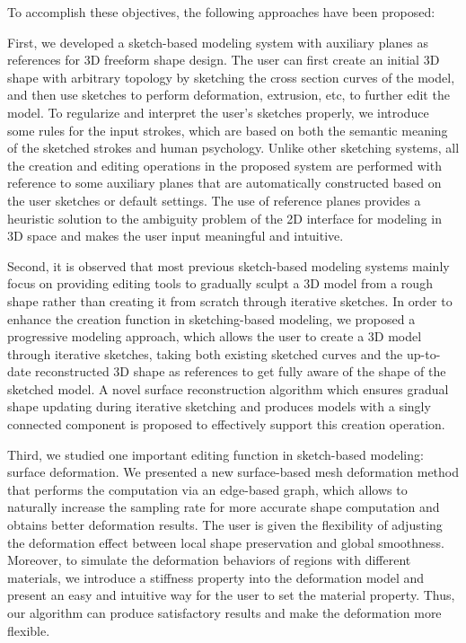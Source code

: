 To accomplish these objectives, the following approaches have been
proposed:

First, we developed a sketch-based modeling system with auxiliary
planes as  references for 3D freeform shape design. The user can
first create an initial 3D shape with arbitrary topology by
sketching the cross section curves of the model, and then use
sketches to perform deformation, extrusion, etc, to further edit the
model. To regularize and interpret the user's sketches properly, we
introduce some rules for the input strokes, which are based on both
the semantic meaning of the sketched strokes and human psychology.
Unlike other sketching systems, all the creation and editing
operations in the proposed system are performed with reference to
some auxiliary planes that are automatically constructed based on
the user sketches or default settings. The use of reference planes
provides a heuristic solution to the ambiguity problem of the 2D
interface for modeling in 3D space and makes the user input
meaningful and intuitive.

Second, it is observed that most previous sketch-based modeling
systems mainly focus on providing editing tools to gradually sculpt
a 3D model from a rough shape rather than creating it from scratch
through iterative sketches. In order to enhance the creation
function in sketching-based modeling, we proposed a progressive
modeling approach, which allows the user to create a 3D model
through iterative sketches, taking both existing sketched curves and
the up-to-date reconstructed 3D shape as references to get fully
aware of the shape of the sketched model. A novel surface
reconstruction algorithm which ensures gradual shape updating during
iterative sketching and produces models with a singly connected
component is proposed to effectively support this creation
operation.

Third, we studied one important editing function in sketch-based
modeling: surface deformation. We presented a new surface-based mesh
deformation method that performs the computation via an edge-based
graph, which allows to naturally increase the sampling rate for more
accurate shape computation and obtains better deformation results.
The user is given the flexibility of adjusting the deformation
effect between local shape preservation and global smoothness.
Moreover, to simulate the deformation behaviors of regions with
different materials, we introduce a stiffness property into the
deformation model and present an easy and intuitive way for the user
to set the material property. Thus, our algorithm can produce
satisfactory results and make the deformation more flexible.

